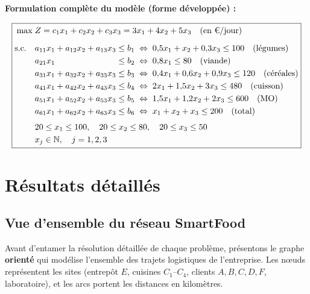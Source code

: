 \documentclass[12pt,a4paper]{article}
\begin{document}
\noindent\textbf{Formulation complète du modèle (forme développée) :}

\begin{equation}
\label{eq:pl_smartfood}
\boxed{
\begin{aligned}
\max\; &Z = c_1 x_1 + c_2 x_2 + c_3 x_3
          = 3x_1 + 4x_2 + 5x_3 \quad (\text{en \texteuro/jour})\\[6pt]
\text{s.c.}\quad
&a_{11}x_1 + a_{12}x_2 + a_{13}x_3 \leq b_1
 \;\Leftrightarrow\; 0{,}5x_1 + x_2 + 0{,}3x_3 \leq 100
 \quad \text{(légumes)}\\
&a_{21}x_1 \phantom{{}+a_{22}x_2+a_{23}x_3} \leq b_2
 \;\Leftrightarrow\; 0{,}8x_1 \leq 80
 \quad \text{(viande)}\\
&a_{31}x_1 + a_{32}x_2 + a_{33}x_3 \leq b_3
 \;\Leftrightarrow\; 0{,}4x_1 + 0{,}6x_2 + 0{,}9x_3 \leq 120
 \quad \text{(céréales)}\\
&a_{41}x_1 + a_{42}x_2 + a_{43}x_3 \leq b_4
 \;\Leftrightarrow\; 2x_1 + 1{,}5x_2 + 3x_3 \leq 480
 \quad \text{(cuisson)}\\
&a_{51}x_1 + a_{52}x_2 + a_{53}x_3 \leq b_5
 \;\Leftrightarrow\; 1{,}5x_1 + 1{,}2x_2 + 2x_3 \leq 600
 \quad \text{(MO)}\\
&a_{61}x_1 + a_{62}x_2 + a_{63}x_3 \leq b_6
 \;\Leftrightarrow\; x_1 + x_2 + x_3 \leq 200
 \quad \text{(total)}\\[4pt]
&20 \leq x_1 \leq 100, \quad 20 \leq x_2 \leq 80, \quad 20 \leq x_3 \leq 50\\
&x_j \in \mathbb{N}, \quad j = 1, 2, 3
\end{aligned}
}
\end{equation}

\newpage

\section{Résultats détaillés}

\subsection{Vue d'ensemble du réseau SmartFood}

Avant d'entamer la résolution détaillée de chaque problème, présentons le graphe
\textbf{orienté} qui modélise l'ensemble des trajets logistiques de l'entreprise.
Les nœuds représentent les sites (entrepôt $E$, cuisines $C_1$--$C_4$, clients
$A,B,C,D,F$, laboratoire), et les arcs portent les distances en kilomètres.
\end{document}
